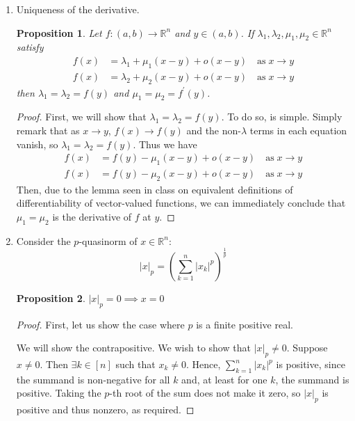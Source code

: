 \documentclass[letterpaper,11pt]{article}
\newtheorem{prop}{Proposition}
\newcommand{\R}{\mathbb{R}}
\newcommand{\as}[1]{\quad\text{as}\;#1}
\begin{document}
\begin{enumerate}
    \item Uniqueness of the derivative.

        \begin{prop}
            Let $f : (a, b) \to \R^n$ and $y \in (a, b)$. If
            $\lambda_1, \lambda_2, \mu_1, \mu_2 \in \R^n$ satisfy
            \begin{align}
                f(x) &= \lambda_1 + \mu_1(x-y) + o(x-y) \as{x \to y}
                \label{eq:uniqderiv1} \\
                f(x) &= \lambda_2 + \mu_2(x-y) + o(x-y) \as{x \to y}
                \label{eq:uniqderiv2}
            \end{align}
            then $\lambda_1 = \lambda_2 = f(y)$ and
            $\mu_1 = \mu_2 = f^\prime(y)$.
        \end{prop}

        \begin{proof}
            First, we will show that $\lambda_1 = \lambda_2 = f(y)$. To do so,
            is simple. Simply remark that as $x \to y$, $f(x) \to f(y)$ and the
            non-$\lambda$ terms in each equation vanish, so
            $\lambda_1 = \lambda_2 = f(y)$. Thus we have
            \begin{align*}
                f(x) &= f(y) - \mu_1(x-y) + o(x-y) \as{x \to y} \\
                f(x) &= f(y) - \mu_2(x-y) + o(x-y) \as{x \to y}
            \end{align*}
            Then, due to the lemma seen in class on equivalent definitions of
            differentiability of vector-valued functions, we can immediately
            conclude that $\mu_1 = \mu_2$ is the derivative of $f$ at $y$.
        \end{proof}

    \item Consider the $p$-quasinorm of $x \in \R^n$:
        \begin{equation*}
            |x|_p = \left( \sum_{k=1}^n |x_k|^p\right)^\frac{1}{p}
        \end{equation*}

        \begin{prop}
            $|x|_p = 0 \implies x = 0$
        \end{prop}

        \begin{proof}
            First, let us show the case where $p$ is a finite positive real.

            We will show the contrapositive. We wish to show that
            $|x|_p \neq 0$. Suppose $x \neq 0$. Then $\exists k \in [n]$ such
            that $x_k \neq 0$. Hence, $\sum_{k=1}^n {|x_k|^p}$ is positive,
            since the summand is non-negative for all $k$ and, at least for
            one $k$, the summand is positive. Taking the $p$-th root of the sum
            does not make it zero, so $|x|_p$ is positive and thus nonzero, as
            required.


\end{proof}
\end{enumerate}
\end{document}

